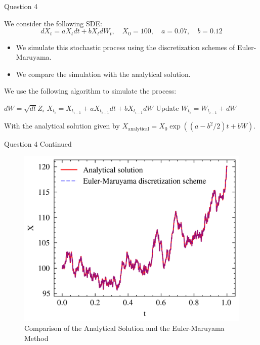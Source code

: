 \documentclass[compress,12pt]{beamer}
\begin{document}
\begin{frame}{Question 4}

    We consider the following SDE:
    \begin{equation*}
        dX_t = aX_t dt + bX_t dW_t, \quad X_0 = 100, \quad a = 0.07, \quad b = 0.12
    \end{equation*}

    \begin{itemize}
        \item We simulate this stochastic process using the discretization schemes of Euler-Maruyama.
        \item We compare the simulation with the analytical solution.
    \end{itemize}

    We use the following algorithm to simulate the process:
     
    \begin{algorithmic}
            \State $dW = \sqrt{dt} Z_i$
            \State $X_{t_i} = X_{t_{i-1}} + aX_{t_{i-1}} dt + bX_{t_{i-1}} dW$
            \State Update $W_{t_i} = W_{t_{i-1}} + dW$
        \EndFor
    \end{algorithmic}

    With the analytical solution given by $X_{\text{analytical}} = X_0 \exp((a - b^2/2)t + bW)$.
\end{frame}

\begin{frame}{Question 4 Continued}
    \begin{figure}
        \centering
        \includegraphics{imgs/eulermaruyama.png}
        \caption{Comparison of the Analytical Solution and the Euler-Maruyama Method}
        \label{fig:question4}
    \end{figure}
\end{frame}
\end{document}
